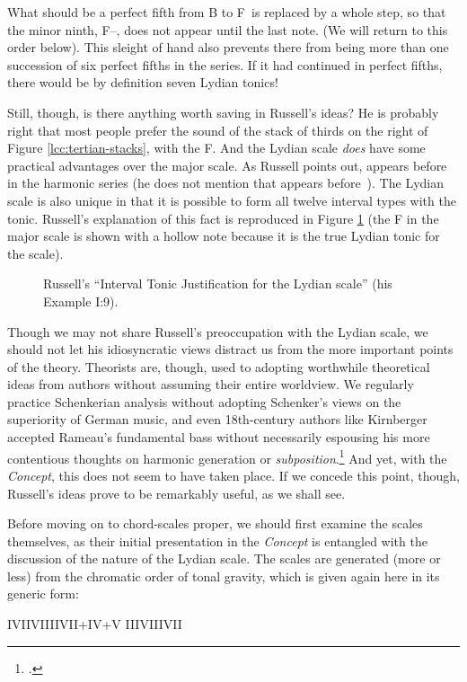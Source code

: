 \noindent What should be a perfect fifth from B to F\sharp\ is replaced by a
whole step, so that the minor ninth, F--\Gflat, does not appear until the last
note. (We will return to this order below). This sleight of hand also prevents
there from being more than one succession of six perfect fifths in the series.
If it had continued in perfect fifths, there would be by definition seven
Lydian tonics!

Still, though, is there anything worth saving in Russell's ideas? He is
probably right that most people prefer the sound of the stack of thirds on the
right of Figure \ref{lcc:tertian-stacks}, with the F\sharp. And the
Lydian scale \emph{does} have some practical advantages over the major scale.
As Russell points out, \sharp{} appears before \nat{} in the harmonic
series (he does not mention that \flat{} appears before \nat{}\,). The
Lydian scale is also unique in that it is possible to form all twelve interval
types with the tonic. Russell's explanation of this fact is reproduced in
Figure \ref{lcc:lydian-intervals} (the F in the major scale is shown with a
hollow note because it is the true Lydian tonic for the scale).

\begin{figure}[tbp]
  \caption[Russell's ``Interval Tonic Justification for the Lydian
  scale.'']{Russell's ``Interval Tonic Justification for the Lydian scale''
    (his Example I:9).}
  \label{lcc:lydian-intervals}
\end{figure}

Though we may not share Russell's preoccupation with the Lydian scale, we
should not let his idiosyncratic views distract us from the more important
points of the theory. Theorists are, though, used to adopting worthwhile
theoretical ideas from authors without assuming their entire worldview. We
regularly practice Schenkerian analysis without adopting Schenker's views on
the superiority of German music, and even 18th-century authors like Kirnberger
accepted Rameau's fundamental bass without necessarily espousing his more
contentious thoughts on harmonic generation or
\emph{subposition}.\footcite[240--41]{lester:1992} And yet, with the
\emph{Concept}, this does not seem to have taken place. If we
concede this point, though, Russell's ideas prove to be remarkably useful, as
we shall see.

Before moving on to chord-scales proper, we should first examine the scales
themselves, as their initial presentation in the \emph{Concept} is entangled
with the discussion of the nature of the Lydian scale. The scales are
generated (more or less) from the chromatic order of tonal gravity, which is
given again here in its generic form: \\
{\centering I\quad V\quad II\quad VI\quad III\quad VII\quad +IV\quad +V\quad
  \flat{}III\quad \flat{}VII\quad IV\quad \flat{}II\quad \par}

